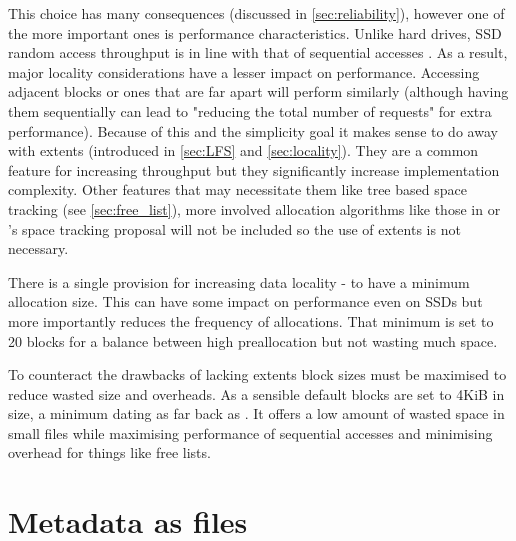         This choice has many consequences (discussed in \autoref{sec:reliability}),
        however one of the more important ones is performance characteristics.
        Unlike hard drives, SSD random access throughput is in line with that
        of sequential accesses \cite{servethehome_review}. As a result, major
        locality considerations have a lesser impact on performance. Accessing
        adjacent blocks or ones that are far apart will perform similarly
        (although having them sequentially can lead to "reducing the total
        number of requests" \cite{ext4_docs} for extra performance). Because of
        this and the simplicity goal it makes sense to do away with extents
        (introduced in \autoref{sec:LFS} and \autoref{sec:locality}). They are a common
        feature for increasing throughput but they significantly increase implementation complexity. Other
        features that may necessitate them like tree based space tracking (see
        \autoref{sec:free_list}), more involved allocation algorithms like those in
         or 's space tracking
        proposal will not be included so the use of extents is not necessary.

        There is a single provision for increasing data locality - to have a
        minimum allocation size. This can have some impact on performance even
        on SSDs but more importantly reduces the frequency of allocations. That
        minimum is set to 20 blocks for a balance between high preallocation
        but not wasting much space.

        To counteract the drawbacks of lacking extents block sizes must be
        maximised to reduce wasted size and overheads. As a sensible default blocks
        are set to 4KiB in size, a minimum dating as far back as 
        . It offers a low amount of wasted space in small files
        while maximising performance of sequential accesses and minimising
        overhead for things like free lists.

    \section{Metadata as files}
        \label{sec:files}

